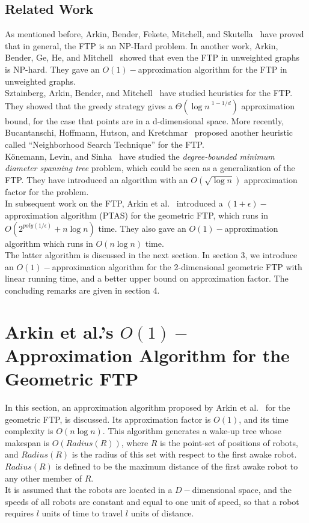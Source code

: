 \documentclass[review]{elsarticle}
\begin{document}
\subsection{Related Work}
As mentioned before, Arkin, Bender, Fekete, Mitchell, and Skutella~\cite{Arkin2006} have proved that in general, the FTP is an NP-Hard problem. In another work, Arkin, Bender, Ge, He, and Mitchell~\cite{Arkin2003} showed that even the FTP in unweighted graphs is NP-hard. They gave an ${ O(1)- }$approximation algorithm for the FTP in unweighted graphs.\\
Sztainberg, Arkin, Bender, and Mitchell~\cite{sztainberg2004} have studied heuristics for the FTP. They showed that the greedy strategy gives a ${ \Theta({\log n~}^{1-1/d}) }$ approximation bound, for the case that points are in a d-dimensional space. More recently, Bucantanschi, Hoffmann, Hutson, and Kretchmar~\cite{Bucantanschi2007} proposed another heuristic called ``Neighborhood Search Technique'' for the FTP.\\
Könemann, Levin, and Sinha~\cite{Konemann2004} have studied the \textit{degree-bounded minimum diameter spanning tree} problem, which could be seen as a generalization of the FTP. They have introduced an algorithm with an ${ O(\sqrt{\log n}) }$ approximation factor for the problem.\\
In subsequent work on the FTP, Arkin et al.~\cite{Arkin2006} introduced a  ${ (1+\epsilon)- }$approximation algorithm (PTAS) for the geometric FTP, which runs in ${ O(2^{poly(1/\epsilon)}+n\log n) }$ time. They also gave an ${ O(1)- }$approximation algorithm which runs in ${ O(n\log n) }$ time.\\
The latter algorithm is discussed in the next section. In section 3, we introduce an ${ O(1)- }$approximation algorithm for the 2-dimensional geometric FTP with linear running time, and a better upper bound on approximation factor. The concluding remarks are given in section 4.

\section{Arkin et al.'s ${ O(1)- }$Approximation Algorithm for the Geometric FTP}
In this section, an approximation algorithm proposed by Arkin et al.~\cite{Arkin2006} for the geometric FTP, is discussed. Its approximation factor is ${ O(1) }$, and its time complexity is ${ O(n\log n) }$. This algorithm generates a wake-up tree whose makespan is ${ O(Radius(R)) }$, where $R$ is the point-set of positions of robots, and ${ Radius(R) }$ is the radius of this set with respect to the first awake robot. ${ Radius(R) }$ is defined to be the maximum distance of the first awake robot to any other member of $R$.\\
It is assumed that the robots are located in a $D-$dimensional space, and the speeds of all robots are constant and equal to one unit of speed, so that a robot requires $l$ units of time to travel $l$ units of distance.
\end{document}
